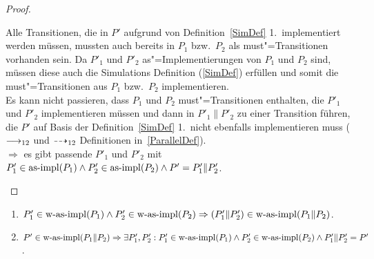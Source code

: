 \begin{proof}
\begin{enumerate}
      Alle Transitionen, die in $P'$ aufgrund von Definition~\ref{SimDef} 1.\
      implementiert werden müssen, mussten auch bereits in $P_1$ bzw.\ $P_2$
      als must"=Transitionen vorhanden sein. Da $P'_1$ und $P'_2$
      as"=Implementierungen von $P_1$ und $P_2$ sind, müssen diese auch die
      Simulations Definition (\ref{SimDef}) erfüllen und somit die
      must"=Transitionen aus $P_1$ bzw.\ $P_2$ implementieren.\\
      Es kann nicht passieren, dass $P_1$ und $P_2$ must"=Transitionen
      enthalten, die $P'_1$ und $P'_2$ implementieren müssen und dann in
      $P'_1\|P'_2$ zu einer Transition führen, die $P'$ auf Basis der
      Definition~\ref{SimDef} 1.\ nicht ebenfalls implementieren muss ($\must
      _{12}$ und $\may _{12}$ Definitionen in~\ref{ParallelDef}).\\
      $\Rightarrow$ es gibt passende $P'_1$ und $P'_2$ mit $P'_1\in\mathrm{as}\text{-}\mathrm{impl} (P_1)
      \land P'_2\in\mathrm{as}\text{-}\mathrm{impl} (P_2) \land P'=P'_1\|P'_2$.
  \end{enumerate}
\end{proof}

\begin{Lem}\mbox{}
  \begin{enumerate}
    \item $P'_1\in\mathrm{w}\text{-}\mathrm{as}\text{-}\mathrm{impl} (P_1) \land P'_2 \in\mathrm{w}\text{-}\mathrm{as}\text{-}\mathrm{impl} (P_2) \Rightarrow
      (P'_1\|P'_2) \in\mathrm{w}\text{-}\mathrm{as}\text{-}\mathrm{impl} (P_1\|P_2)$.
    \item $P' \in\mathrm{w}\text{-}\mathrm{as}\text{-}\mathrm{impl} (P_1\|P_2) \Rightarrow \exists P'_1,P'_2 : P'_1
      \in\mathrm{w}\text{-}\mathrm{as}\text{-}\mathrm{impl} (P_1) \land P'_2 \in\mathrm{w}\text{-}\mathrm{as}\text{-}\mathrm{impl} (P_2) \land P'_1\|P'_2=P'$.
  \end{enumerate}
\end{Lem}

